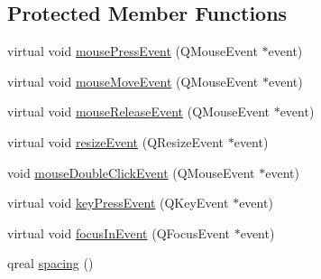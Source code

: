 \subsection*{Protected Member Functions}
\begin{DoxyCompactItemize}
\item 
virtual void \hyperlink{class_u_b_thumbnail_widget_a5691f8f210352b7b6b52ef6a3ca4d7a6}{mouse\-Press\-Event} (Q\-Mouse\-Event $\ast$event)
\item 
virtual void \hyperlink{class_u_b_thumbnail_widget_aef2025372b0c6517c01dbb4516f485f3}{mouse\-Move\-Event} (Q\-Mouse\-Event $\ast$event)
\item 
virtual void \hyperlink{class_u_b_thumbnail_widget_a5d58b8b0db7e0acf240a15536f958266}{mouse\-Release\-Event} (Q\-Mouse\-Event $\ast$event)
\item 
virtual void \hyperlink{class_u_b_thumbnail_widget_abe271f4e2df19c063b4570640b05be94}{resize\-Event} (Q\-Resize\-Event $\ast$event)
\item 
void \hyperlink{class_u_b_thumbnail_widget_a21c5f6b24658f9482a113e01e74af7df}{mouse\-Double\-Click\-Event} (Q\-Mouse\-Event $\ast$event)
\item 
virtual void \hyperlink{class_u_b_thumbnail_widget_a052d61f5fbeb39ae5f312c4c3ddf94a4}{key\-Press\-Event} (Q\-Key\-Event $\ast$event)
\item 
virtual void \hyperlink{class_u_b_thumbnail_widget_a277497abe2368939b696093d96cff9ff}{focus\-In\-Event} (Q\-Focus\-Event $\ast$event)
\item 
qreal \hyperlink{class_u_b_thumbnail_widget_af4e84c1474f32521f8b2470db69fb620}{spacing} ()
\end{DoxyCompactItemize}
